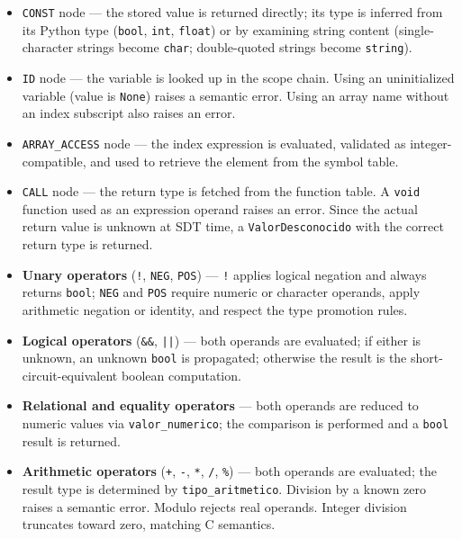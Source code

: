 \documentclass[letterpaper,12pt,oneside]{article}
\begin{document}
\begin{itemize}
    \item \texttt{CONST} node --- the stored value is returned directly; its type is inferred from its Python type (\texttt{bool}, \texttt{int}, \texttt{float}) or by examining string content (single-character strings become \texttt{char}; double-quoted strings become \texttt{string}).
    \item \texttt{ID} node --- the variable is looked up in the scope chain. Using an uninitialized variable (value is \texttt{None}) raises a semantic error. Using an array name without an index subscript also raises an error.
    \item \texttt{ARRAY\_ACCESS} node --- the index expression is evaluated, validated as integer-compatible, and used to retrieve the element from the symbol table.
    \item \texttt{CALL} node --- the return type is fetched from the function table. A \texttt{void} function used as an expression operand raises an error. Since the actual return value is unknown at SDT time, a \texttt{ValorDesconocido} with the correct return type is returned.
    \item \textbf{Unary operators} (\texttt{!}, \texttt{NEG}, \texttt{POS}) --- \texttt{!} applies logical negation and always returns \texttt{bool}; \texttt{NEG} and \texttt{POS} require numeric or character operands, apply arithmetic negation or identity, and respect the type promotion rules.
    \item \textbf{Logical operators} (\texttt{\&\&}, \texttt{||}) --- both operands are evaluated; if either is unknown, an unknown \texttt{bool} is propagated; otherwise the result is the short-circuit-equivalent boolean computation.
    \item \textbf{Relational and equality operators} --- both operands are reduced to numeric values via \texttt{valor\_numerico}; the comparison is performed and a \texttt{bool} result is returned.
    \item \textbf{Arithmetic operators} (\texttt{+}, \texttt{-}, \texttt{*}, \texttt{/}, \texttt{\%}) --- both operands are evaluated; the result type is determined by \texttt{tipo\_aritmetico}. Division by a known zero raises a semantic error. Modulo rejects real operands. Integer division truncates toward zero, matching C semantics.
\end{itemize}
\end{document}
